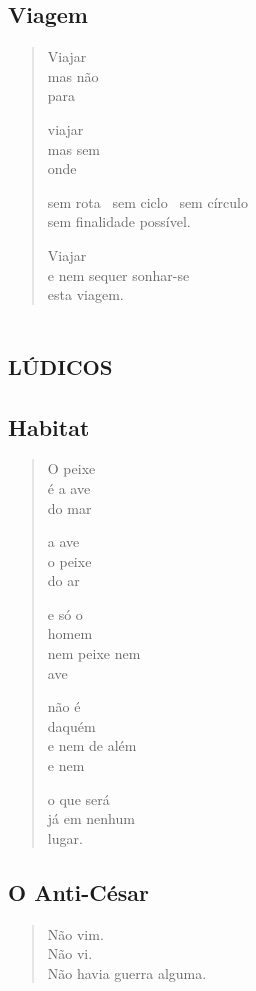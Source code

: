 \chapter{Viagem}

\begin{verse}
Viajar\\
mas não\\
para

viajar\\
mas sem\\
onde

sem rota\quad\mbox{ } sem ciclo\quad\mbox{ } sem círculo\\
sem finalidade possível.

Viajar\\
e nem sequer sonhar-se\\
esta viagem.
\end{verse}

\part*{\textsc{lúdicos}}

\chapter{Habitat}

\begin{verse}
O peixe\\
é a ave\\
do mar

a ave\\
o peixe\\
do ar

e só o\\
homem\\
nem peixe nem\\
ave

não é\\
daquém\\
e nem de além\\
e nem

o que será\\
já em nenhum\\
lugar.
\end{verse}

\chapter{O Anti-César}

\begin{verse}
Não vim.\\
Não vi.\\
Não havia guerra alguma.
\end{verse}

